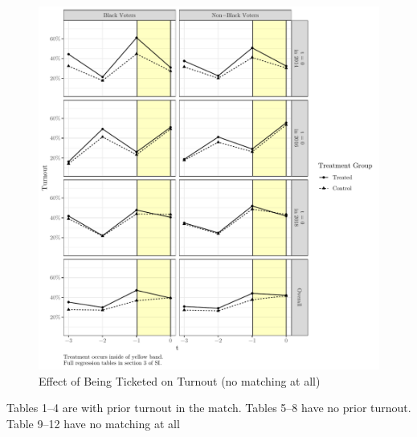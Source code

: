 \documentclass[
  12pt,
]{article}
\begin{document}
\begin{figure}[H]

{\centering \includegraphics{compile_files/figure-latex/did-no-matching-1} 

}

\caption{\label{fig:did-1}Effect of Being Ticketed on Turnout (no matching at all)}\label{fig:did-no-matching}
\end{figure}

Tables 1--4 are with prior turnout in the match. Tables 5--8 have no prior turnout. Table 9--12 have no matching at all

\begin{singlespace}








 





\end{singlespace}
\end{document}
